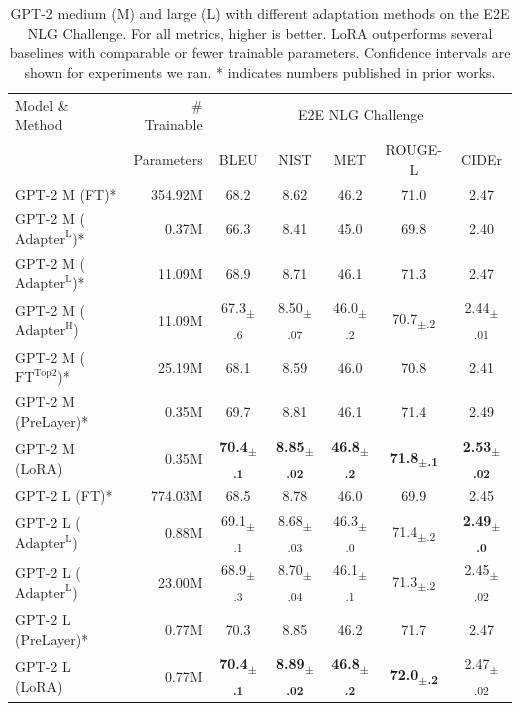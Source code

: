 \begin{table}[t]
\centering
\begin{tabular}{l|r|ccccc}
\hline
\toprule
Model \& Method & \# Trainable & \multicolumn{5}{c}{E2E NLG Challenge} \\
       & Parameters & BLEU & NIST & MET & ROUGE-L & CIDEr \\
\midrule
GPT-2 M (FT)* & 354.92M                         & 68.2 &	8.62 &	46.2 &	71.0 &	2.47  \\
GPT-2 M ($\text{Adapter}^{\text{L}}$)* & 0.37M  & 66.3 &	8.41 &	45.0 &	69.8 &	2.40  \\
GPT-2 M ($\text{Adapter}^{\text{L}}$)* & 11.09M & 68.9 &	8.71 &	46.1 &	71.3 &	2.47  \\
GPT-2 M ($\text{Adapter}^{\text{H}}$) & 11.09M & 67.3\textsubscript{$\pm$.6} & 8.50\textsubscript{$\pm$.07}	& 46.0\textsubscript{$\pm$.2} & 70.7\textsubscript{$\pm$.2}	& 2.44\textsubscript{$\pm$.01}        \\
GPT-2 M ($\text{FT}^{\text{Top2}}$)*   & 25.19M & 68.1 & 8.59 & 46.0  &  70.8 & 2.41  \\
GPT-2 M (PreLayer)* & 0.35M & 69.7 & 8.81 & 46.1 & 71.4 & 2.49  \\
GPT-2 M (LoRA) & 0.35M & \textbf{70.4\textsubscript{$\pm$.1}} & \textbf{8.85\textsubscript{$\pm$.02}} & \textbf{46.8\textsubscript{$\pm$.2}} & \textbf{71.8\textsubscript{$\pm$.1}} & \textbf{2.53\textsubscript{$\pm$.02}} \\
\midrule
GPT-2 L (FT)* & 774.03M & 68.5 & 8.78 & 46.0 & 69.9 & 2.45  \\
GPT-2 L ($\text{Adapter}^{\text{L}}$) & 0.88M  & 69.1\textsubscript{$\pm$.1} & 8.68\textsubscript{$\pm$.03} & 46.3\textsubscript{$\pm$.0} & 71.4\textsubscript{$\pm$.2} &	\textbf{2.49\textsubscript{$\pm$.0}}  \\
GPT-2 L ($\text{Adapter}^{\text{L}}$) & 23.00M & 68.9\textsubscript{$\pm$.3} & 8.70\textsubscript{$\pm$.04} & 46.1\textsubscript{$\pm$.1} & 71.3\textsubscript{$\pm$.2} &   2.45\textsubscript{$\pm$.02}  \\
GPT-2 L (PreLayer)* & 0.77M & 70.3 & 8.85 & 46.2 & 71.7 & 2.47  \\
GPT-2 L (LoRA) & 0.77M & \textbf{70.4\textsubscript{$\pm$.1}} & \textbf{8.89\textsubscript{$\pm$.02}} & \textbf{46.8\textsubscript{$\pm$.2}} & \textbf{72.0\textsubscript{$\pm$.2}} & 2.47\textsubscript{$\pm$.02} \\
\bottomrule
\end{tabular}
\caption{GPT-2 medium (M) and large (L) with different adaptation methods on the E2E NLG Challenge. For all metrics, higher is better. LoRA outperforms several baselines with comparable or fewer trainable parameters. Confidence intervals are shown for experiments we ran. * indicates numbers published in prior works.
}
\label{tab:gpt2_ft_results}
\end{table}
